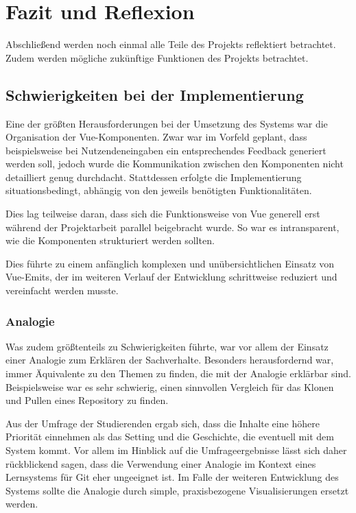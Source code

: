 \chapter{Fazit und Reflexion}
Abschließend werden noch einmal alle Teile des Projekts reflektiert betrachtet. Zudem werden mögliche zukünftige Funktionen des Projekts betrachtet.

\section{Schwierigkeiten bei der Implementierung}
Eine der größten Herausforderungen bei der Umsetzung des Systems war die Organisation der Vue-Komponenten. Zwar war im Vorfeld geplant, dass beispielsweise bei Nutzendeneingaben ein entsprechendes Feedback generiert werden soll, jedoch wurde die Kommunikation zwischen den Komponenten nicht detailliert genug durchdacht. Stattdessen erfolgte die Implementierung situationsbedingt, abhängig von den jeweils benötigten Funktionalitäten.

Dies lag teilweise daran, dass sich die Funktionsweise von Vue generell erst während der Projektarbeit parallel beigebracht wurde. 
So war es intransparent, wie die Komponenten strukturiert werden sollten.

Dies führte zu einem anfänglich komplexen und unübersichtlichen Einsatz von Vue-Emits, der im weiteren Verlauf der Entwicklung schrittweise reduziert und vereinfacht werden musste.

\subsection{Analogie}
Was zudem größtenteils zu Schwierigkeiten führte, war vor allem der Einsatz einer Analogie zum Erklären der Sachverhalte. Besonders herausfordernd war, immer Äquivalente zu den Themen zu finden, die mit der Analogie erklärbar sind.
Beispielsweise war es sehr schwierig, einen sinnvollen Vergleich für das Klonen und Pullen eines Repository zu finden.

Aus der Umfrage der Studierenden ergab sich, dass die Inhalte eine höhere Priorität einnehmen als das Setting und die Geschichte, die eventuell mit dem System kommt.
Vor allem im Hinblick auf die Umfrageergebnisse lässt sich daher rückblickend sagen, dass die Verwendung einer Analogie im Kontext eines Lernsystems für Git eher ungeeignet ist.
Im Falle der weiteren Entwicklung des Systems sollte die Analogie durch simple, praxisbezogene Visualisierungen ersetzt werden.

